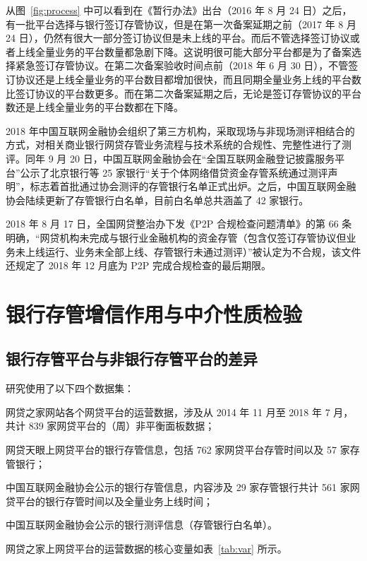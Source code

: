 \documentclass[lang=cn,11pt,authoryear]{elegantpaper}
\begin{document}
从图~\ref{fig:process} 中可以看到在《暂行办法》出台（2016 年 8 月 24 日）之后，有一批平台选择与银行签订存管协议，但是在第一次备案延期之前（2017 年 8 月 24 日），仍然有很大一部分签订协议但是未上线的平台。而后不管选择签订协议或者上线全量业务的平台数量都急剧下降。这说明很可能大部分平台都是为了备案选择紧急签订存管协议。在第二次备案验收时间点前（2018 年 6 月 30 日），不管签订协议还是上线全量业务的平台数目都增加很快，而且同期全量业务上线的平台数比签订协议的平台数更多。而在第二次备案延期之后，无论是签订存管协议的平台数还是上线全量业务的平台数都在下降。

2018 年中国互联网金融协会组织了第三方机构，采取现场与非现场测评相结合的方式，对相关商业银行网贷存管业务流程与技术系统的合规性、完整性进行了测评。同年 9 月 20 日，中国互联网金融协会在“全国互联网金融登记披露服务平台”公示了北京银行等 25 家银行“关于个体网络借贷资金存管系统通过测评声明”，标志着首批通过协会测评的存管银行名单正式出炉。之后，中国互联网金融协会陆续更新了存管银行白名单，目前白名单总共涵盖了 42 家银行。

2018 年 8 月 17 日，全国网贷整治办下发《P2P 合规检查问题清单》的第 66 条明确，“网贷机构未完成与银行业金融机构的资金存管（包含仅签订存管协议但业务未上线运行、业务未全部上线、存管银行未通过测评）”被认定为不合规，该文件还规定了 2018 年 12 月底为 P2P 完成合规检查的最后期限。

\section{银行存管增信作用与中介性质检验}

\subsection{银行存管平台与非银行存管平台的差异}

研究使用了以下四个数据集：
\begin{enumerate*}[label=（\arabic*）]
    \item 网贷之家网站各个网贷平台的运营数据，涉及从 2014 年 11 月至 2018 年 7 月，共计 839 家网贷平台的（周）非平衡面板数据；
    \item 网贷天眼上网贷平台的银行存管信息，包括 762 家网贷平台存管时间以及 57 家存管银行；
    \item 中国互联网金融协会公示的银行存管信息，内容涉及 29 家存管银行共计 561 家网贷平台的银行存管时间以及全量业务上线时间；
    \item 中国互联网金融协会公示的银行测评信息（存管银行白名单）。
\end{enumerate*}
网贷之家上网贷平台的运营数据的核心变量如表~\ref{tab:var} 所示。
\end{document}
